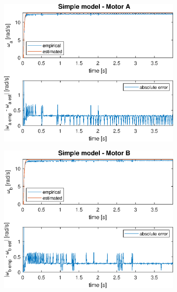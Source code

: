 \documentclass[a4paper,kul]{kulakarticle} %
\begin{document}
\begin{figure}[htp!]
	\centering
	\begin{subfigure}[b]{0.48\textwidth}
		\centering
		\includegraphics[width=\linewidth]{step_response_simple_a.eps}
	\end{subfigure}
	\hfill
	\begin{subfigure}[b]{0.48\textwidth}
		\centering
		\includegraphics[width=\linewidth]{step_response_simple_b.eps}
	\end{subfigure}
	\par\bigskip
	\begin{subfigure}[b]{0.48\textwidth}

\end{subfigure}
\end{figure}
\end{document}
